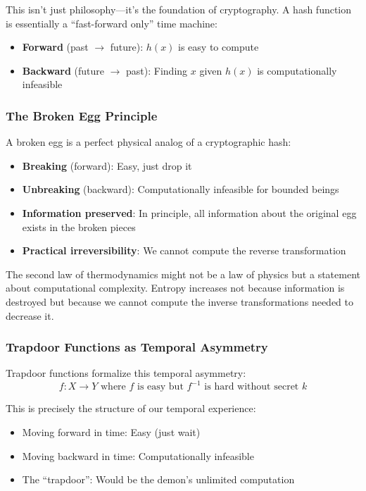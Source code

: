 \documentclass[11pt]{article}
\begin{document}
This isn't just philosophy---it's the foundation of cryptography. A hash function is essentially a ``fast-forward only'' time machine:
\begin{itemize}
\item \textbf{Forward} (past $\to$ future): $h(x)$ is easy to compute
\item \textbf{Backward} (future $\to$ past): Finding $x$ given $h(x)$ is computationally infeasible
\end{itemize}

\subsubsection{The Broken Egg Principle}

A broken egg is a perfect physical analog of a cryptographic hash:
\begin{itemize}
\item \textbf{Breaking} (forward): Easy, just drop it
\item \textbf{Unbreaking} (backward): Computationally infeasible for bounded beings
\item \textbf{Information preserved}: In principle, all information about the original egg exists in the broken pieces
\item \textbf{Practical irreversibility}: We cannot compute the reverse transformation
\end{itemize}

The second law of thermodynamics might not be a law of physics but a statement about computational complexity. Entropy increases not because information is destroyed but because we cannot compute the inverse transformations needed to decrease it.

\subsubsection{Trapdoor Functions as Temporal Asymmetry}

Trapdoor functions formalize this temporal asymmetry:
$$f: X \to Y \text{ where } f \text{ is easy but } f^{-1} \text{ is hard without secret } k$$

This is precisely the structure of our temporal experience:
\begin{itemize}
\item Moving forward in time: Easy (just wait)
\item Moving backward in time: Computationally infeasible
\item The ``trapdoor'': Would be the demon's unlimited computation
\end{itemize}
\end{document}
